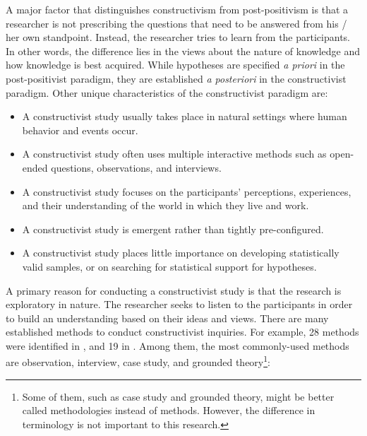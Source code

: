 A major factor that distinguishes constructivism from post-positivism is that a researcher is not prescribing the questions that need to be answered from his / her own standpoint. Instead, the researcher tries to learn from the participants. In other words, the difference lies in the views about the nature of knowledge and how knowledge is best acquired. While hypotheses are specified \textit{a priori} in the post-positivist paradigm, they are established \textit{a posteriori} in the constructivist paradigm. Other unique characteristics of the constructivist paradigm are:

\begin{itemize}
	\item A constructivist study usually takes place in natural settings where human behavior and events occur.
	\item A constructivist study often uses multiple interactive methods such as open-ended questions, observations, and interviews.
	\item A constructivist study focuses on the participants' perceptions, experiences, and their understanding of the world in which they live and work.
	\item A constructivist study is emergent rather than tightly pre-configured. 
	\item A constructivist study places little importance on developing statistically valid samples, or on searching for statistical support for hypotheses.
\end{itemize}

A primary reason for conducting a constructivist study is that the research is exploratory in nature. The researcher seeks to listen to the participants in order to build an understanding based on their ideas and views. There are many established methods to conduct constructivist inquiries. For example, 28 methods were identified in \cite{Tesch:1990}, and 19 in \cite{Wolcott:2001}. Among them, the most commonly-used methods are observation, interview, case study, and grounded theory\footnote{Some of them, such as case study and grounded theory, might be better called methodologies instead of methods. However, the difference in terminology is not important to this research.}:

